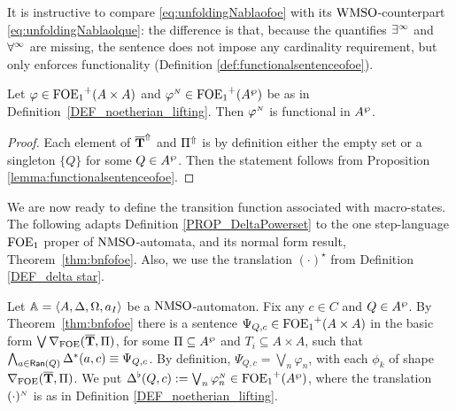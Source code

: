 It is instructive to compare \eqref{eq:unfoldingNablaofoe} with its $\mathrm{WMSO}$-counterpart \eqref{eq:unfoldingNablaolque}: the difference is that, because the quantifies $\exists^\infty$ and $\forall^\infty$ are missing, the sentence does not impose any cardinality requirement, but only enforces functionality (Definition \ref{def:functionalsentenceofoe}).


\begin{lemma}\label{lemma:automatafunctionalsentence}
Let $\varphi \in {\ensuremath{\mathrm{FOE}_1}}^+(A \times A)$ and $\varphi^{{\scriptscriptstyle N}}\in {\ensuremath{\mathrm{FOE}_1}}^+(A^{\wp} )$ be as in Definition~\ref{DEF_noetherian_lifting}. Then $\varphi^{{\scriptscriptstyle N}}$ is functional in $A^{\wp}$.
 \end{lemma}
\begin{proof}
Each element of $\overline{{\mathbf{T}}}^{\Uparrow}$ and $\Pi^{\Uparrow}$ is by definition either the empty set or a singleton $\{Q\}$ for some $Q \in A^{\wp}$. Then the statement follows from Proposition \ref{lemma:functionalsentenceofoe}.\end{proof}

 We are now ready to define the transition function associated with macro-states. The following adapts Definition \ref{PROP_DeltaPowerset} to the one step-language $\mathrm{FOE}_1$ proper of $\mathrm{NMSO}$-automata, and its normal form result, Theorem~\ref{thm:bnfofoe}. Also, we use the translation $(\cdot)^{\star}$ from Definition \ref{DEF_delta star}.
\begin{definition}\label{PROP_DeltaPowerset_noet}
Let $\mathbb{A} = \langle{A,\Delta,\Omega,a_I}\rangle$ be a $\mathrm{NMSO}$-automaton. Fix any $c \in C$ and $Q \in A^{\wp}$. By Theorem~\ref{thm:bnfofoe} there is a sentence $\Psi_{Q,c} \in {\ensuremath{\mathrm{FOE}_1}}^+(A\times A)$ in the basic form $\bigvee \nabla_{\mathrm{FOE}}(\overline{{\mathbf{T}}},\Pi)$, for some $\Pi \subseteq A^{\wp}$ and $T_i \subseteq A \times A$, such that $\bigwedge_{a \in \mathsf{Ran}(Q)} \Delta^{*}(a,c) \equiv \Psi_{Q,c}$.
By definition, $\Psi_{Q,c} = \bigvee_{n}\varphi_n$, with each $\phi_{k}$ of shape $\nabla_{\mathrm{FOE}}(\overline{{\mathbf{T}}},\Pi)$.
%
We put $\Delta^{\flat}(Q,c) := \bigvee_{n}\varphi_n^{{\scriptscriptstyle N}}  \in {\ensuremath{\mathrm{FOE}_1}}^+(A^{\wp})$, where the translation $(\cdot)^{{\scriptscriptstyle N}}$ is as in Definition \ref{DEF_noetherian_lifting}.
\end{definition}

